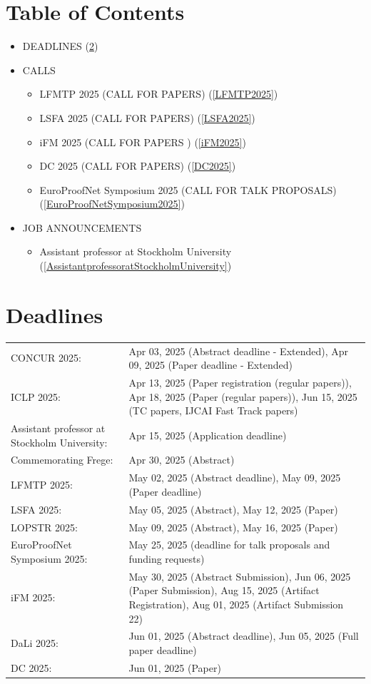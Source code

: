 \documentclass[prodmode,acmtecs]{acmsmall} %
\begin{document}
\section{Table of Contents}\begin{itemize}\item DEADLINES (\cref{deadlines}) 
 
\item CALLS 
 
\begin{itemize}\item LFMTP 2025 (CALL FOR PAPERS) (\cref{LFMTP2025})
\item LSFA 2025 (CALL FOR PAPERS) (\cref{LSFA2025})
\item iFM 2025 (CALL FOR PAPERS ) (\cref{iFM2025})
\item DC 2025 (CALL FOR PAPERS) (\cref{DC2025})
\item EuroProofNet Symposium 2025 (CALL FOR TALK PROPOSALS) (\cref{EuroProofNetSymposium2025})
\end{itemize} 
\item JOB ANNOUNCEMENTS 
 
\begin{itemize}\item Assistant professor at Stockholm University (\cref{AssistantprofessoratStockholmUniversity})
\end{itemize} 
\end{itemize}\section{Deadlines}\label{deadlines}\begin{tabulary}{\linewidth}{LL}CONCUR 2025:  & Apr 03, 2025 (Abstract deadline - Extended), Apr 09, 2025 (Paper deadline - Extended) \\
ICLP 2025:  & Apr 13, 2025 (Paper registration (regular papers)), Apr 18, 2025 (Paper (regular papers)), Jun 15, 2025 (TC papers, IJCAI Fast Track papers) \\
Assistant professor at Stockholm University:  & Apr 15, 2025 (Application deadline) \\
Commemorating Frege:  & Apr 30, 2025 (Abstract) \\
LFMTP 2025:  & May 02, 2025 (Abstract  deadline), May 09, 2025 (Paper  deadline) \\
LSFA 2025:  & May 05, 2025 (Abstract), May 12, 2025 (Paper) \\
LOPSTR 2025:  & May 09, 2025 (Abstract), May 16, 2025 (Paper) \\
EuroProofNet Symposium 2025:  & May 25, 2025 (deadline for talk proposals and funding requests) \\
iFM 2025:  & May 30, 2025 (Abstract Submission), Jun 06, 2025 (Paper Submission), Aug 15, 2025 (Artifact Registration), Aug 01, 2025 (Artifact Submission 22) \\
DaLi 2025:  & Jun 01, 2025 (Abstract deadline), Jun 05, 2025 (Full paper deadline) \\
DC 2025:  & Jun 01, 2025 (Paper) \\
\end{tabulary}
\end{document}
